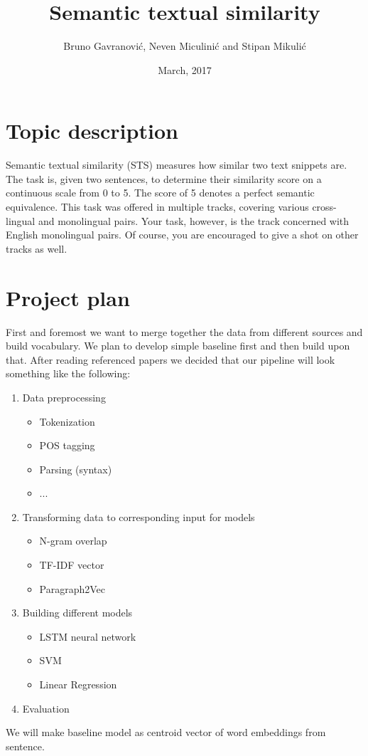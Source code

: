 \documentclass[times, utf8]{article}
\begin{document}
\title{\textbf{Semantic textual similarity}}
\date{March, 2017}
\author{Bruno Gavranovi\'c, Neven Miculini\'c and Stipan Mikuli\'c}
\maketitle

\section*{Topic description}

Semantic textual similarity (STS) measures how similar two text snippets are. The task is, given two sentences, to determine their similarity score on a continuous scale from 0 to 5. The score of 5 denotes a perfect semantic equivalence. This task was offered in multiple tracks, covering various cross-lingual and monolingual pairs. Your task, however, is the track concerned with English monolingual pairs. Of course, you are encouraged to give a shot on other tracks as well.
\section*{Project plan}
First and foremost we want to merge together the data from different sources and build vocabulary. We plan to develop simple baseline first and then build upon that.
After reading referenced papers we decided that our pipeline will look something like the following:

\begin{enumerate}
\item Data preprocessing

\begin{itemize}
\item Tokenization
\item POS tagging
\item Parsing (syntax)
\item ...
\end{itemize}

\item Transforming data to corresponding input for models
\begin{itemize}
\item N-gram overlap
\item TF-IDF vector
\item Paragraph2Vec
\end{itemize}


\item Building different models
\begin{itemize}
\item LSTM neural network
\item SVM
\item Linear Regression
\end{itemize}

\item Evaluation
\end{enumerate}

We will make baseline model as centroid vector of word embeddings from sentence.
\end{document}
